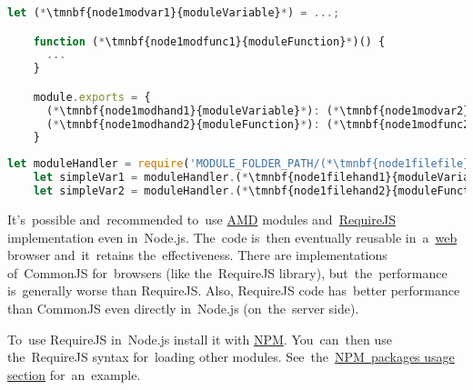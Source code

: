 \enlargethispage{20mm}
\thispagestyle{empty}
\begin{lstlisting}[language=JavaScript,title={Module file \mbit{\tmnbf{node1modfile}{moduleFile}.js}}]
    let (*\tmnbf{node1modvar1}{moduleVariable}*) = ...;

    function (*\tmnbf{node1modfunc1}{moduleFunction}*)() {
      ...
    }

    module.exports = {
      (*\tmnbf{node1modhand1}{moduleVariable}*): (*\tmnbf{node1modvar2}{moduleVariable}*),
      (*\tmnbf{node1modhand2}{moduleFunction}*): (*\tmnbf{node1modfunc2}{moduleFunction}*)
    }
\end{lstlisting}
\begin{lstlisting}[language=JavaScript,title={JavaScript executable file using the~module}]
    let moduleHandler = require('MODULE_FOLDER_PATH/(*\tmnbf{node1filefile}{moduleFile}[ForestGreen]*)');
    let simpleVar1 = moduleHandler.(*\tmnbf{node1filehand1}{moduleVariable}*); // Using module variable
    let simpleVar2 = moduleHandler.(*\tmnbf{node1filehand2}{moduleFunction}*)(); // Using module function
\end{lstlisting}
\newpage

\note It's~possible and~recommended to~use \hyperref[amd]{AMD} modules and~\hyperref[requirejs]{RequireJS} implementation even in~Node.js.
The~code is~then eventually reusable in~a~\hyperref[internetweb]{web} browser and~it~retains the~effectiveness.
There are implementations of~CommonJS for~browsers (like the~RequireJS library), but~the~performance is~generally worse than RequireJS\@.
Also, RequireJS code has~better performance than CommonJS even directly in~Node.js (on~the~server side).

To~use RequireJS in~Node.js install it with \hyperref[npm]{NPM}.
You~can~then use the~RequireJS syntax for~loading other modules.
See~the~\hyperref[npmpackageusage]{NPM~packages usage section} for~an~example.

